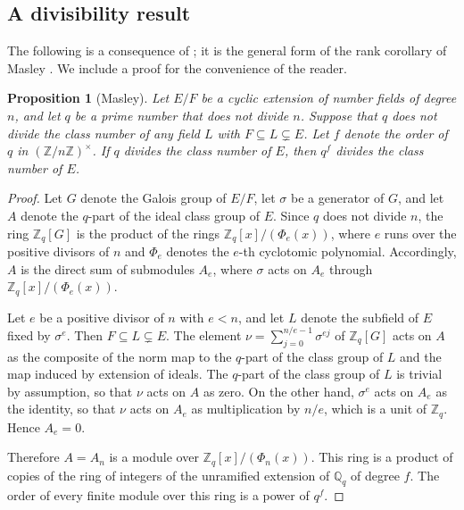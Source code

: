 \documentclass[11pt]{amsart}
\theoremstyle{plain}
\newtheorem{proposition}[theorem]{Proposition}
\theoremstyle{definition}
\begin{document}
\subsection{A divisibility result}

The following is a consequence of \cite[Theorems 6 and 8]{vdL82}; it is the general form of the rank corollary of Masley \cite[Corollary 2.15]{Ma78}.
We include a proof for the convenience of the reader.

\begin{proposition}[Masley] \label{prop:masley}
Let $E/F$ be a cyclic extension of number fields of degree $n$, and let $q$ be a prime number that does not divide $n$.
Suppose that $q$ does not divide the class number of any field $L$ with $F \subseteq L \subsetneq E$.
Let $f$ denote the order of $q$ in $(\mathbb{Z}/n\mathbb{Z})^\times$.
If $q$ divides the class number of $E$, then $q^f$ divides the class number of $E$.
\end{proposition}

\begin{proof}
Let $G$ denote the Galois group of $E/F$, let $\sigma$ be a generator of $G$, and let $A$ denote the $q$-part of the ideal class group of $E$.
Since $q$ does not divide $n$, the ring $\mathbb{Z}_q[G]$ is the product of the rings $\mathbb{Z}_q[x]/(\Phi_e(x))$, where $e$ runs over the positive divisors of $n$ and $\Phi_e$ denotes the $e$-th cyclotomic polynomial.
Accordingly, $A$ is the direct sum of submodules $A_e$, where $\sigma$ acts on $A_e$ through $\mathbb{Z}_q[x]/(\Phi_e(x))$.

Let $e$ be a positive divisor of $n$ with $e < n$, and let $L$ denote the subfield of $E$ fixed by $\sigma^e$.
Then $F \subseteq L \subsetneq E$.
The element $\nu = \sum_{j=0}^{n/e-1} \sigma^{ej}$ of $\mathbb{Z}_q[G]$ acts on $A$ as the composite of the norm map to the $q$-part of the class group of $L$ and the map induced by extension of ideals.
The $q$-part of the class group of $L$ is trivial by assumption, so that $\nu$ acts on $A$ as zero.
On the other hand, $\sigma^e$ acts on $A_e$ as the identity, so that $\nu$ acts on $A_e$ as multiplication by $n/e$, which is a unit of $\mathbb{Z}_q$.
Hence $A_e = 0$.

Therefore $A = A_n$ is a module over $\mathbb{Z}_q[x]/(\Phi_n(x))$.
This ring is a product of copies of the ring of integers of the unramified extension of $\mathbb{Q}_q$ of degree $f$.
The order of every finite module over this ring is a power of $q^f$.
\end{proof}
\end{document}
